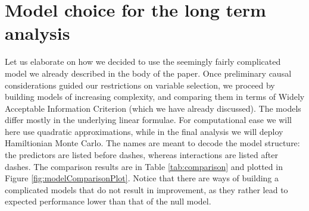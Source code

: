 \documentclass[preprint,12pt]{elsarticle}
\begin{document}
\section{Model choice for the long term analysis}\label{sec:priors}


Let us elaborate on how we decided to use  the seemingly fairly
complicated model we already described in the body of the paper. Once preliminary causal considerations guided our
restrictions on variable selection, we proceed by building models of
increasing complexity, and comparing them in terms of Widely Acceptable
Information Criterion (which we have already discussed). The models
differ mostly in the underlying linear formulae. For computational ease
we will here use quadratic approximations, while in the final analysis
we will deploy Hamiltionian Monte Carlo. The names are meant to decode
the model structure: the predictors are listed before dashes, whereas
interactions are listed after dashes. The comparison results are in
Table \ref{tab:comparison} and plotted in Figure
\ref{fig:modelComparisonPlot}. Notice that there are ways of building a
complicated models that do not result in improvement, as they rather
lead to expected performance lower than that of the null model.


\footnotesize
\end{document}

